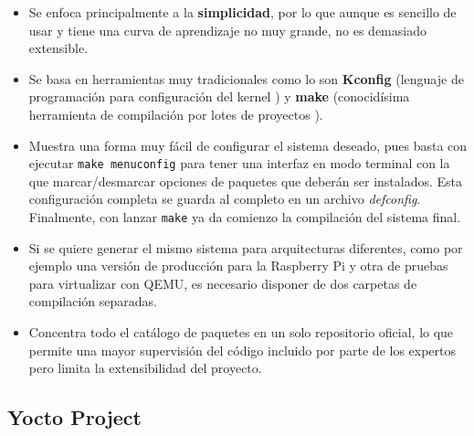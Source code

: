 \begin{itemize}
	\item Se enfoca principalmente a la \textbf{simplicidad}, por lo que aunque es sencillo de usar y tiene una curva de aprendizaje no muy grande, no es demasiado extensible.
	\item Se basa en herramientas muy tradicionales como lo son  \textbf{Kconfig} (lenguaje de programación para configuración del kernel \cite{kconfig}) y \textbf{make} (conocidísima herramienta de compilación por lotes de proyectos \cite{make-tool}).
	\item Muestra una forma muy fácil de configurar el sistema deseado, pues basta con ejecutar \texttt{make menuconfig} para tener una interfaz en modo terminal con la que marcar/desmarcar opciones de paquetes que deberán ser instalados. Esta configuración completa se guarda al completo en un archivo \textit{defconfig}. Finalmente, con lanzar \texttt{make} ya da comienzo la compilación del sistema final.
	\item Si se quiere generar el mismo sistema para arquitecturas diferentes, como por ejemplo una versión de producción para la Raspberry Pi y otra de pruebas para virtualizar con QEMU, es necesario disponer de dos carpetas de compilación separadas.
	\item Concentra todo el catálogo de paquetes en un solo repositorio oficial, lo que permite una mayor supervisión del código incluido por parte de los expertos pero limita la extensibilidad del proyecto.
\end{itemize}

\subsection{Yocto Project}

